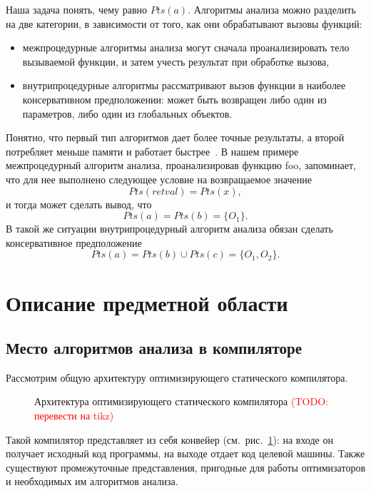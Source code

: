 \documentclass[14pt,titlepage]{extarticle}
\newcommand{\todo}[1]{\textcolor{red}{(\eng{TODO}: #1)}}
\newcommand{\eng}[1]{{\English#1}}
\let\oldsection\section
\renewcommand{\section}{\newpage\oldsection}
\begin{document}
        Наша задача понять, чему равно $Pts(a)$.
        Алгоритмы анализа можно разделить на две категории, в зависимости от
        того, как они обрабатывают вызовы функций:
        \begin{itemize}
          \item межпроцедурные алгоритмы анализа могут сначала проанализировать
                тело вызываемой функции, и затем учесть результат при обработке
                вызова,
          \item внутрипроцедурные алгоритмы рассматривают вызов функции в
                наиболее консервативном предположении: может быть возвращен
                либо один из параметров, либо один из глобальных объектов.
        \end{itemize}
        Понятно, что первый тип алгоритмов дает более точные результаты,
        а второй потребляет меньше памяти и работает
        быстрее~\cite[с.~117]{andersen}.
        В нашем примере межпроцедурный алгоритм анализа, проанализировав
        функцию foo, запоминает, что для нее выполнено следующее условие на
        возвращаемое значение
        \[Pts(retval) = Pts(x),\]
        и тогда может сделать вывод, что \[Pts(a) = Pts(b) = \{O_1\}.\]
        В такой же ситуации внутрипроцедурный алгоритм анализа обязан сделать
        консервативное предположение
        \[Pts(a) = Pts(b) \cup Pts(c) = \{O_1, O_2\}.\]

  \section{Описание предметной области}

    \subsection{Место алгоритмов анализа в компиляторе}

      Рассмотрим общую архитектуру оптимизирующего статического компилятора.

      \begin{figure}[!htb]
        \caption{Архитектура оптимизирующего статического компилятора
                 \todo{перевести на tikz}}
        \label{fig:arch}
      \end{figure}

      Такой компилятор представляет из себя конвейер (см.~рис.~\ref{fig:arch}):
      на входе он получает исходный код программы, на выходе отдает код целевой
      машины.
      Также существуют промежуточные представления, пригодные для работы
      оптимизаторов и необходимых им алгоритмов анализа.
\end{document}
